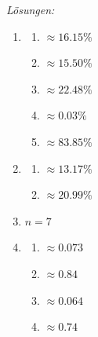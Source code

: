 \clearpage
\emph{Lösungen:}
\begin{enumerate}
    \item \begin{enumerate}
              \item \(\approx 16.15\%\)
              \item \(\approx 15.50\%\)
              \item \(\approx 22.48 \%\)
              \item \(\approx 0.03 \%\)
              \item \(\approx 83.85\%\)
          \end{enumerate}
    \item \begin{enumerate}
              \item \(\approx 13.17\%\)
              \item \(\approx 20.99\%\)
          \end{enumerate}
    \item \(n=7\)

    \item \begin{enumerate}
              \item \(\approx 0.073\)
              \item \(\approx 0.84\)
              \item \(\approx 0.064\)
              \item \(\approx 0.74\)
          \end{enumerate}

\end{enumerate}






























\clearpage
